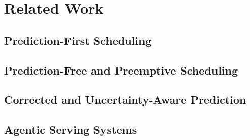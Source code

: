\clearpage
\section{Related Work}

\subsection{Prediction-First Scheduling}

\subsection{Prediction-Free and Preemptive Scheduling}

\subsection{Corrected and Uncertainty-Aware Prediction}

\subsection{Agentic Serving Systems}
